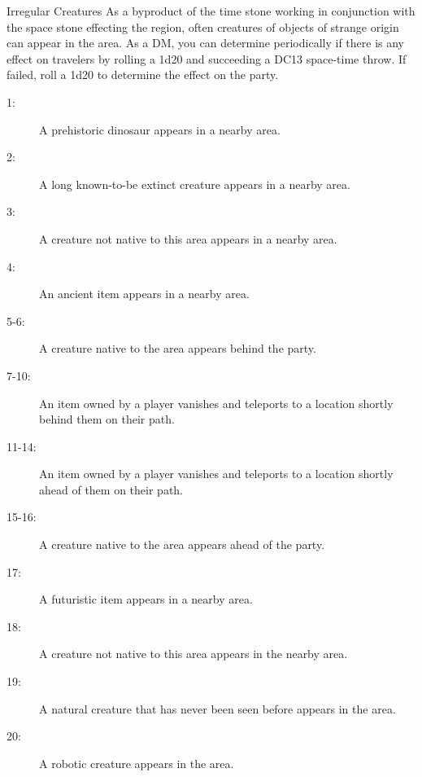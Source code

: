 \begin{commentbox}{Irregular Creatures}
	As a byproduct of the time stone working in conjunction with the space stone effecting the region, often creatures of objects of strange origin can appear in the area. As a DM, you can determine periodically if there is any effect on travelers by rolling a 1d20 and succeeding a DC13 space-time throw. If failed, roll a 1d20 to determine the effect on the party.
	\hline
	\begin{description}
		\item[1:] A prehistoric dinosaur appears in a nearby area.
		\item[2:] A long known-to-be extinct creature appears in a nearby area.
		\item[3:] A creature not native to this area appears in a nearby area.
		\item[4:] An ancient item appears in a nearby area.
		\item[5-6:] A creature native to the area appears behind the party.
		\item[7-10:] An item owned by a player vanishes and teleports to a location shortly behind them on their path.
		\item[11-14:] An item owned by a player vanishes and teleports to a location shortly ahead of them on their path.
		\item[15-16:] A creature native to the area appears ahead of the party.
		\item[17:] A futuristic item appears in a nearby area.
		\item[18:] A creature not native to this area appears in the nearby area.
		\item[19:] A natural creature that has never been seen before appears in the area.
		\item[20:] A robotic creature appears in the area.
	\end{description}
\end{commentbox}

